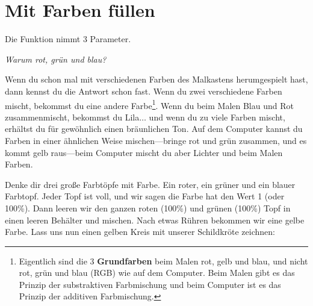 \section{Mit Farben füllen}
Die  Funktion nimmt 3 Parameter.
\par
\emph{Warum rot, grün und blau?}
\par
Wenn du schon mal mit verschiedenen Farben des Malkastens herumgespielt hast, dann kennst du die Antwort schon fast. Wenn du zwei verschiedene Farben mischt, bekommst du eine andere Farbe\footnote{Eigentlich sind die 3 \textbf{Grundfarben} beim Malen rot, gelb und blau, und nicht rot, grün und blau (RGB) wie auf dem Computer. Beim Malen gibt es das Prinzip der substraktiven Farbmischung und beim Computer ist es das Prinzip der additiven Farbmischung.}. Wenn du beim Malen Blau und Rot zusammenmischt, bekommst du Lila\texorpdfstring{$\ldots$}{...} und wenn du zu viele Farben mischt, erhältst du für gewöhnlich einen bräunlichen Ton. Auf dem Computer kannst du Farben in einer ähnlichen Weise mischen---bringe rot und grün zusammen, und es kommt gelb raus---beim Computer mischt du aber Lichter und beim Malen Farben.

Denke dir drei große Farbtöpfe mit Farbe. Ein roter, ein grüner und ein blauer Farbtopf. Jeder Topf ist voll, und wir sagen die Farbe hat den Wert 1 (oder 100\%). Dann leeren wir den ganzen roten (100\%) und grünen (100\%) Topf in einen leeren Behälter und mischen. Nach etwas Rühren bekommen wir eine gelbe Farbe. Lass uns nun einen gelben Kreis mit unserer Schildkröte zeichnen:

